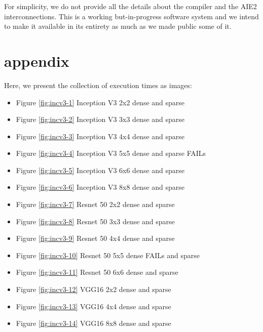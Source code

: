 \documentclass[conference]{IEEEtran}
\begin{document}
For simplicity, we do not provide all the details about the
compiler and the AIE2 interconnections. This is a working
but-in-progress software system and we intend to make it available in
its entirety as much as we made public some of it.
     
     
\section{appendix}




Here, we
present the collection of execution times as images:
\begin{itemize}
  \item Figure \ref{fig:incv3-1} Inception V3 2x2 dense and sparse
  \item Figure \ref{fig:incv3-2} Inception V3 3x3 dense and sparse
  \item Figure \ref{fig:incv3-3} Inception V3 4x4 dense and sparse
  \item Figure \ref{fig:incv3-4} Inception V3 5x5 dense and sparse FAILs
  \item Figure \ref{fig:incv3-5} Inception V3 6x6 dense and sparse 
  \item Figure \ref{fig:incv3-6} Inception V3 8x8 dense and sparse
  \item Figure \ref{fig:incv3-7} Resnet 50 2x2 dense and sparse   
  \item Figure \ref{fig:incv3-8} Resnet 50 3x3 dense and sparse   
  \item Figure \ref{fig:incv3-9} Resnet 50 4x4 dense and sparse   
  \item Figure \ref{fig:incv3-10} Resnet 50 5x5 dense FAILs and sparse   
  \item Figure \ref{fig:incv3-11} Resnet 50 6x6 dense and sparse   
  \item Figure \ref{fig:incv3-12} VGG16  2x2 dense and sparse   
  \item Figure \ref{fig:incv3-13} VGG16  4x4 dense and sparse   
  \item Figure \ref{fig:incv3-14} VGG16  8x8 dense and sparse   
\end{itemize}
\newpage 
{}
\end{document}
